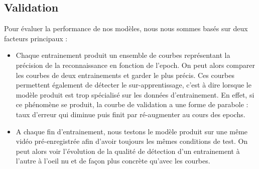 \documentclass{article}
\begin{document}
\subsection{Validation}
Pour évaluer la performance de nos modèles, nous nous sommes basés sur deux facteurs principaux :
\begin{itemize}
    \item Chaque entrainement produit un ensemble de courbes représentant la précision de la reconnaissance en fonction de l'epoch. On peut alors comparer les courbes de deux entrainements et garder le plus précis. Ces courbes permettent également de détecter le sur-apprentissage, c'est à dire lorsque le modèle produit est trop spécialisé sur les données d'entrainement. En effet, si ce phénomène se produit, la courbe de validation a une forme de parabole : taux d'erreur qui diminue puis finit par ré-augmenter au cours des epochs.

    \item A chaque fin d'entrainement, nous testons le modèle produit sur une même vidéo pré-enregistrée afin d'avoir toujours les mêmes conditions de test. On peut alors voir l'évolution de la qualité de détection d'un entrainement à l'autre à l'oeil nu et de façon plus concrète qu'avec les courbes.
\end{itemize}
\end{document}
